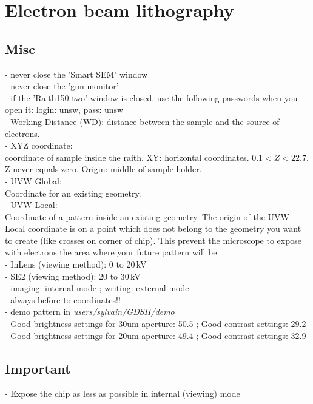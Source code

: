 \section{Electron beam lithography}

\subsection{Misc}
- never close the 'Smart SEM' window\\
- never close the 'gun monitor'\\
- if the 'Raith150-two' window is closed, use the following passwords when you open it: login: unsw, pass: unsw\\
- Working Distance (WD): distance between the sample and the source of electrons. \\
- XYZ coordinate:\\
coordinate of sample inside the raith. XY: horizontal coordinates. $0.1<Z<22.7$. Z never equals zero. Origin: middle of sample holder. \\
- UVW Global:\\
Coordinate for an existing geometry.\\
- UVW Local:\\
Coordinate of a pattern inside an existing geometry. The origin of the UVW Local coordinate is on a point which does not belong to the geometry you want to create (like crosses on corner of chip). This prevent the microscope to expose with electrons the area where your future pattern will be.\\
- InLens (viewing method): 0 to 20\,kV\\
- SE2 (viewing method): 20 to 30\,kV\\
- imaging: internal mode ; writing: external mode\\
- always  before  to coordinates!!\\
- demo pattern in \textit{users/sylvain/GDSII/demo} \\
- Good brightness settings for 30um aperture: 50.5 ; Good contrast settings: 29.2\\
- Good brightness settings for 20um aperture: 49.4 ; Good contrast settings: 32.9\\
 
\subsection{Important}

- Expose the chip as less as possible in internal (viewing) mode\\

